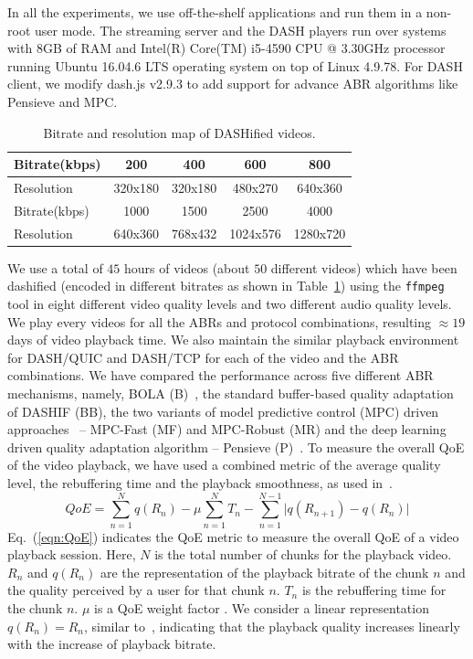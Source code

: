 In all the experiments, we use off-the-shelf applications and run them in a non-root user mode. The streaming server and the DASH players run over systems with 8GB of RAM and Intel(R) Core(TM) i5-4590 CPU @ 3.30GHz processor running Ubuntu 16.04.6 LTS operating system on top of Linux 4.9.78. For DASH client, we modify dash.js v2.9.3 to add support for advance ABR algorithms like Pensieve and MPC.


\begin{table}[h]
     \caption{\label{table:bitrate}Bitrate and resolution map of DASHified videos.}
	\centering
	\begin{tabular}{|l|c|c|c|c|}
		\hline
		Bitrate(kbps) & 200 & 400 & 600 & 800 \\ \hline
		Resolution & 320x180 & 320x180 & 480x270 & 640x360 \\ \hline \hline
		Bitrate(kbps) & 1000 & 1500 & 2500 & 4000 \\ \hline
		Resolution & 640x360 & 768x432 & 1024x576 & 1280x720 \\ \hline
	\end{tabular}
\end{table}

We use a total of $45$ hours of videos (about $50$ different videos) which have been dashified (encoded in different bitrates as shown in Table~\ref{table:bitrate}) using the {\tt ffmpeg} tool in eight different video quality levels and two different audio quality levels. We play every videos for all the ABRs and protocol combinations, resulting $\approx 19$ days of video playback time. We also maintain the similar playback environment for DASH/QUIC and DASH/TCP for each of the video and the ABR combinations. 
We have compared the performance across five different ABR mechanisms, namely, BOLA (B)~\cite{Spiteri2016}, the standard buffer-based quality adaptation of DASHIF (BB), the two variants of model predictive control (MPC) driven approaches~\cite{yin2015control} -- MPC-Fast (MF) and MPC-Robust (MR) and the deep learning driven quality adaptation algorithm -- Pensieve (P)~\cite{mao2017neural}. To measure the overall QoE of the video playback, we have used a combined metric of the average quality level, the rebuffering time and the playback smoothness, as used in~\cite{yin2015control,mao2017neural}.
\begin{equation}
QoE=\sum_{n=1}^{N}q(R_n)-\mu\sum_{n=1}^{N}T_n-\sum_{n=1}^{N-1} \bigg\vert q(R_{n+1})-q(R_n)  \bigg\vert
\label{eqn:QoE}
\end{equation}
Eq.~(\ref{eqn:QoE}) indicates the QoE metric to measure the overall QoE of a video playback session. Here, $N$ is the total number of chunks for the playback video. $R_n$ and $q(R_n)$ are the representation of the playback bitrate of the chunk $n$ and the quality perceived by a user for that chunk $n$. $T_n$ is the rebuffering time for the chunk $n$. $\mu$ is a QoE weight factor \cite{yin2015control}.
We consider a linear representation $q(R_n) = R_n$, similar to~\cite{yin2015control}, indicating that the playback quality increases linearly with the increase of playback bitrate.
